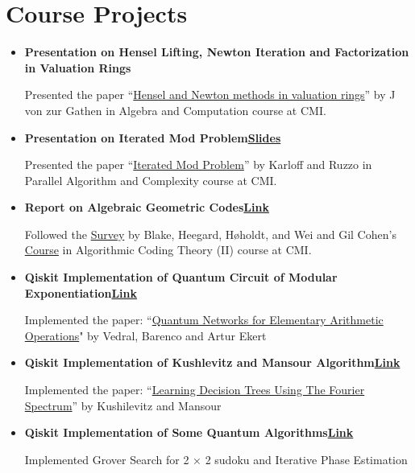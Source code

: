 \documentclass[10pt,a4paper,sans,colorlinks]{moderncv}        %
\begin{document}
\section{Course Projects}
\begin{itemize}
	\item \textbf{Presentation on Hensel Lifting, Newton Iteration and Factorization in Valuation Rings}

	\hfill  Presented the paper ``\href{https://www.ams.org/journals/mcom/1984-42-166/S0025-5718-1984-0736459-9/}{Hensel and Newton methods in valuation rings}” by J von zur Gathen in Algebra and Computation course at CMI.
	\item \textbf{Presentation on Iterated Mod Problem\hfill \href{https://sohamch08.github.io/assets/parallel-presentation-iterated-mod.pdf}{Slides}}
	
	\hfill  Presented the paper ``\href{https://www.sciencedirect.com/science/article/pii/0890540189900084}{Iterated Mod Problem}” by Karloff and Ruzzo in Parallel 	Algorithm and Complexity course at CMI.
	\item \textbf{Report on Algebraic Geometric Codes\hfill \href{https://sohamch08.github.io//assets/act-report.pdf}{Link}}
	
	\hfill Followed the \href{https://dl.acm.org/doi/abs/10.5555/334156.334207}{Survey} by Blake, Heegard, Høholdt, and Wei and Gil Cohen's \href{https://www.gilcohen.org/2022-ag-codes}{Course}  in Algorithmic Coding Theory (II) course at CMI.
	\item \textbf{Qiskit Implementation of Quantum Circuit of Modular Exponentiation\hfill \href{https://github.com/bluecheese123/-Best_Project-}{Link}}
	
	\hfill Implemented the paper: ``\href{https://arxiv.org/pdf/quant-ph/9511018.pdf}{Quantum Networks for Elementary Arithmetic Operations}" by  Vedral, Barenco and Artur Ekert 
	
	\item \textbf{Qiskit Implementation of Kushlevitz and Mansour Algorithm}\hfill \href{https://github.com/sohamch08/Qiskit-Quantum-Algo/blob/master/Kushlevitz%20and%20Mansour%20Algorithm.ipynb}{\textbf{Link}}
	
	\hfill Implemented the paper: ``\href{https://dl.acm.org/doi/pdf/10.1145/103418.103466}{Learning Decision Trees Using The Fourier Spectrum}” by Kushilevitz and Mansour
	
	\item \textbf{Qiskit Implementation of Some Quantum Algorithms\hfill  \href{https://github.com/sohamch08/Qiskit-Quantum-Algo}{Link}}
	
	\hfill Implemented Grover Search for 2 × 2 sudoku and Iterative Phase Estimation
\end{itemize}
\end{document}
